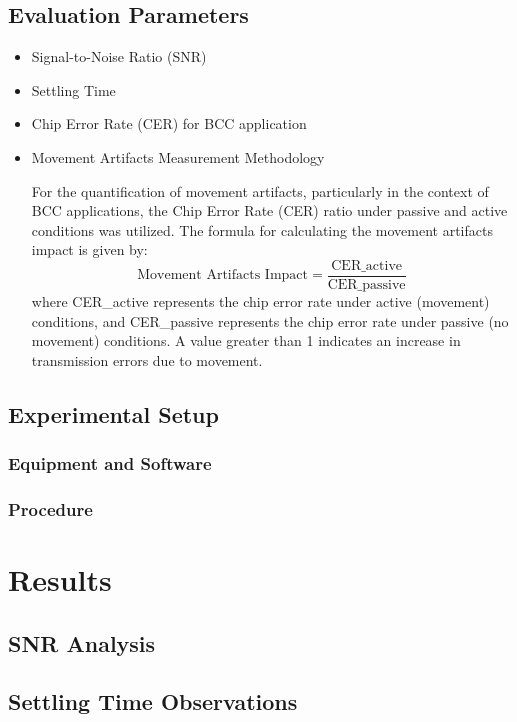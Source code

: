 \documentclass[conference]{IEEEtran}
\begin{document}
\subsection{Evaluation Parameters}
\begin{itemize}
    \item Signal-to-Noise Ratio (SNR)
    \item Settling Time
    \item Chip Error Rate (CER) for BCC application
    \item Movement Artifacts Measurement Methodology
    
For the quantification of movement artifacts, particularly in the context of BCC applications, the Chip Error Rate (CER) ratio under passive and active conditions was utilized. The formula for calculating the movement artifacts impact is given by:
\begin{equation}
    \text{Movement Artifacts Impact} = \frac{\text{CER\_active}}{\text{CER\_passive}}
\end{equation}
where CER\_active represents the chip error rate under active (movement) conditions, and CER\_passive represents the chip error rate under passive (no movement) conditions. A value greater than 1 indicates an increase in transmission errors due to movement.

\end{itemize}

\subsection{Experimental Setup}
\subsubsection{Equipment and Software}
\subsubsection{Procedure}

\section{Results}
\subsection{SNR Analysis}
\subsection{Settling Time Observations}
\end{document}
